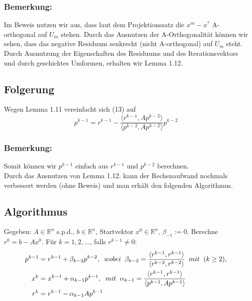 \documentclass{article}
\begin{document}
\subsubsection{Bemerkung:}
Im Beweis nutzen wir aus, dass laut dem Projektionssatz die $x^{m} - x^{*}$ A-orthogonal auf $U_{m}$ stehen. Durch das Ausnutzen der A-Orthogonalität können wir sehen, dass das negative Residuum senkrecht (nicht A-orthogonal) auf $U_{m}$ steht. Durch Ausnutzung der Eigenschaften des Residuums und des Iterationsvektors und durch geschicktes Umformen, erhalten wir Lemma 1.12.

\subsection{Folgerung}
Wegen Lemma 1.11 vereinfacht sich (13) auf
\begin{equation*}
p^{k-1} = r^{k-1} - \frac {\langle r^{k-1}, Ap^{k-2} \rangle} {\langle p^{k-2}, Ap^{k-2} \rangle} p^{k-2}
\end{equation*}

\subsubsection{Bemerkung:}
Somit können wir $p^{k-1}$ einfach aus $r^{k-1}$ und $p^{k-2}$ berechnen.\\
Durch das Ausnutzen von Lemma 1.12. kann der Rechenaufwand nochmals verbessert werden (ohne Beweis) und man erhält den folgenden Algorithmus.

\subsection{Algorithmus}
Gegeben: $A \in \mathbb{R}^{n}$ s.p.d., $b \in \mathbb{R}^{n}$, Startvektor $x^{0} \in \mathbb{R}^{n}$, $\beta_{-1} := 0$. Berechne $r^{0} = b - Ax^{0}$. Für $k = 1,2,...$, falls $r^{k-1} \ne 0$:
\begin{subequations}
\begin{align}
	p^{k-1} &= r^{k-1} + \beta_{k-2}p^{k-2}, \hspace{2mm} wobei \hspace{2mm} \beta_{k-2} = \frac {\langle r^{k-1}, r^{k-1} \rangle} {\langle r^{k-2}, r^{k-2} \rangle} \hspace{2mm} mit \hspace{2mm} (k \ge 2),\\
	x^{k} &= x^{k-1} + \alpha_{k-1}p^{k-1}, \hspace{2mm} mit \hspace{2mm} \alpha_{k-1} = \frac {\langle r^{k-1}, r^{k-1} \rangle} {\langle p^{k-1}, Ap^{k-1} \rangle}\\
	r^{k} &= r^{k-1} - \alpha_{k-1}Ap^{k-1}
\end{align}
\end{subequations}
\end{document}
